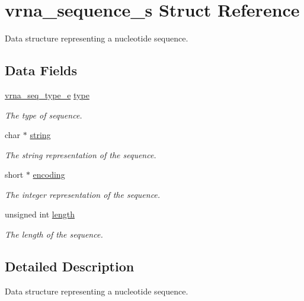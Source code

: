 \hypertarget{structvrna__sequence__s}{}\section{vrna\+\_\+sequence\+\_\+s Struct Reference}
\label{structvrna__sequence__s}


Data structure representing a nucleotide sequence.  


\subsection*{Data Fields}
\begin{DoxyCompactItemize}
\item 
\mbox{\hyperlink{sequence_8h_a85cda3fcf5d6bd7ec090d3a96e808609}{vrna\+\_\+seq\+\_\+type\+\_\+e}} \mbox{\hyperlink{structvrna__sequence__s_aee11f4cc6f792cd36afab3bf7a30ca7b}{type}}
\begin{DoxyCompactList}\small\item\em The type of sequence. \end{DoxyCompactList}\item 
char $\ast$ \mbox{\hyperlink{structvrna__sequence__s_aa885a2c52b3f87fb6c8f51a77a3430a7}{string}}
\begin{DoxyCompactList}\small\item\em The string representation of the sequence. \end{DoxyCompactList}\item 
short $\ast$ \mbox{\hyperlink{structvrna__sequence__s_a8010ad82da6766e859e6f25e275a1d89}{encoding}}
\begin{DoxyCompactList}\small\item\em The integer representation of the sequence. \end{DoxyCompactList}\item 
unsigned int \mbox{\hyperlink{structvrna__sequence__s_af60876d93312ce0b842574a14c3a9cdd}{length}}
\begin{DoxyCompactList}\small\item\em The length of the sequence. \end{DoxyCompactList}\end{DoxyCompactItemize}


\subsection{Detailed Description}
Data structure representing a nucleotide sequence. 

